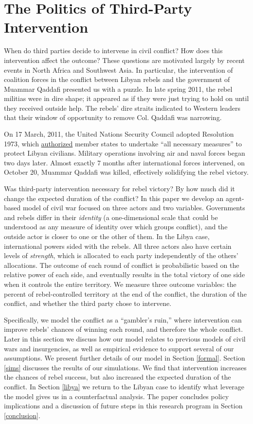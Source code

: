 \section{The Politics of Third-Party Intervention}
\label{intro}

When do third parties decide to intervene in civil conflict? How does this intervention affect the outcome? These questions are motivated largely by recent events in North Africa and Southwest Asia. In particular, the intervention of coalition forces in the conflict between Libyan rebels and the government of Muammar Qaddafi presented us with a puzzle. In late spring 2011, the rebel militias were in dire shape; it appeared as if they were just trying to hold on until they received outside help. The rebels' dire straits indicated to Western leaders that their window of opportunity to remove Col. Qaddafi was narrowing. 

On 17 March, 2011, the United Nations Security Council adopted Resolution 1973, which \href{http://www.un.org/News/Press/docs//2011/sc10200.doc.htm}{authorized} member states to undertake ``all necessary measures'' to protect Libyan civilians. Military operations involving air and naval forces began two days later. Almost exactly 7 months after international forces intervened, on October 20, Muammar Qaddafi was killed, effectively solidifying the rebel victory. 

Was third-party intervention necessary for rebel victory? By how much did it change the expected duration of the conflict? In this paper we develop an agent-based model of civil war focused on three actors and two variables. Governments and rebels differ in their \emph{identity} (a one-dimensional scale that could be understood as any measure of identity over which groups conflict), and the outside actor is closer to one or the other of them. In the Libya case, international powers sided with the rebels. All three actors also have certain levels of \emph{strength}, which is allocated to each party independently of the others' allocations. The outcome of each round of conflict is probabilistic based on the relative power of each side, and eventually results in the total victory of one side when it controls the entire territory. We measure three outcome variables: the percent of rebel-controlled territory at the end of the conflict, the duration of the conflict, and whether the third party chose to intervene. 

Specifically, we model the conflict as a ``gambler's ruin,'' where intervention can improve rebels' chances of winning each round, and therefore the whole conflict. Later in this section we discuss how our model relates to previous models of civil wars and insurgencies, as well as empirical evidence to support several of our assumptions. We present further details of our model in Section \ref{formal}. Section \ref{sims} discusses the results of our simulations. We find that intervention increases the chances of rebel success, but also increased the expected duration of the conflict. In Section \ref{libya} we return to the Libyan case to identify what leverage the model gives us in a counterfactual analysis. The paper concludes policy implications and a discussion of future steps in this research program in Section \ref{conclusion}.


